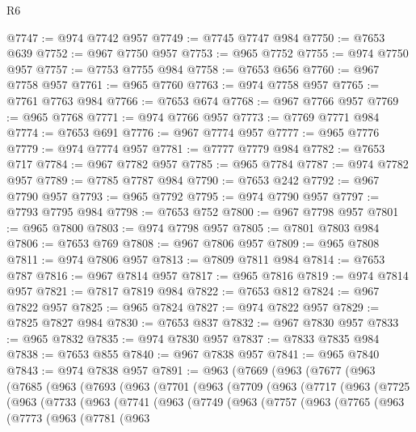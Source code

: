 \begin{lexlean}{R6}
\begin{coremodule}
@7747 := @974 @7742 @957
@7749 := @7745 @7747 @984
@7750 := @7653 @639
@7752 := @967 @7750 @957
@7753 := @965 @7752
@7755 := @974 @7750 @957
@7757 := @7753 @7755 @984
@7758 := @7653 @656
@7760 := @967 @7758 @957
@7761 := @965 @7760
@7763 := @974 @7758 @957
@7765 := @7761 @7763 @984
@7766 := @7653 @674
@7768 := @967 @7766 @957
@7769 := @965 @7768
@7771 := @974 @7766 @957
@7773 := @7769 @7771 @984
@7774 := @7653 @691
@7776 := @967 @7774 @957
@7777 := @965 @7776
@7779 := @974 @7774 @957
@7781 := @7777 @7779 @984
@7782 := @7653 @717
@7784 := @967 @7782 @957
@7785 := @965 @7784
@7787 := @974 @7782 @957
@7789 := @7785 @7787 @984
@7790 := @7653 @242
@7792 := @967 @7790 @957
@7793 := @965 @7792
@7795 := @974 @7790 @957
@7797 := @7793 @7795 @984
@7798 := @7653 @752
@7800 := @967 @7798 @957
@7801 := @965 @7800
@7803 := @974 @7798 @957
@7805 := @7801 @7803 @984
@7806 := @7653 @769
@7808 := @967 @7806 @957
@7809 := @965 @7808
@7811 := @974 @7806 @957
@7813 := @7809 @7811 @984
@7814 := @7653 @787
@7816 := @967 @7814 @957
@7817 := @965 @7816
@7819 := @974 @7814 @957
@7821 := @7817 @7819 @984
@7822 := @7653 @812
@7824 := @967 @7822 @957
@7825 := @965 @7824
@7827 := @974 @7822 @957
@7829 := @7825 @7827 @984
@7830 := @7653 @837
@7832 := @967 @7830 @957
@7833 := @965 @7832
@7835 := @974 @7830 @957
@7837 := @7833 @7835 @984
@7838 := @7653 @855
@7840 := @967 @7838 @957
@7841 := @965 @7840
@7843 := @974 @7838 @957
@7891 := @963
    (@7669
      (@963
        (@7677
          (@963
            (@7685
              (@963
                (@7693
                  (@963
                    (@7701
                      (@963
                        (@7709
                          (@963
                            (@7717
                              (@963
                                (@7725
                                  (@963
                                    (@7733
                                      (@963
                                        (@7741
                                          (@963
                                            (@7749
                                              (@963
                                                (@7757
                                                  (@963
                                                    (@7765
                                                      (@963
                                                        (@7773
                                                          (@963
                                                            (@7781
                                                              (@963

\end{coremodule}
\end{lexlean}
